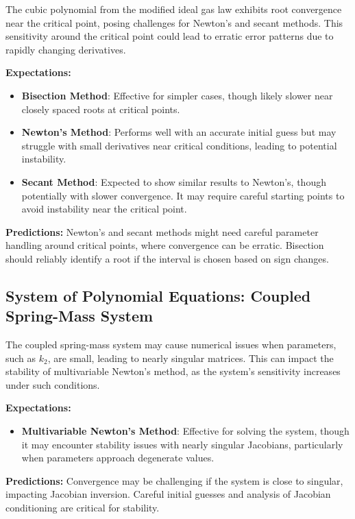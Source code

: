 \documentclass[12pt]{article}
\begin{document}
\noindent The cubic polynomial from the modified ideal gas law exhibits root convergence near the critical point, posing challenges for Newton's and secant methods. This sensitivity around the critical point could lead to erratic error patterns due to rapidly changing derivatives.

\noindent \textbf{Expectations:}
\begin{itemize}
    \item \textbf{Bisection Method}: Effective for simpler cases, though likely slower near closely spaced roots at critical points.
    \item \textbf{Newton’s Method}: Performs well with an accurate initial guess but may struggle with small derivatives near critical conditions, leading to potential instability.
    \item \textbf{Secant Method}: Expected to show similar results to Newton's, though potentially with slower convergence. It may require careful starting points to avoid instability near the critical point.
\end{itemize}

\noindent \textbf{Predictions:}  
Newton’s and secant methods might need careful parameter handling around critical points, where convergence can be erratic. Bisection should reliably identify a root if the interval is chosen based on sign changes.

\subsection*{System of Polynomial Equations: Coupled Spring-Mass System}

The coupled spring-mass system may cause numerical issues when parameters, such as \( k_2 \), are small, leading to nearly singular matrices. This can impact the stability of multivariable Newton’s method, as the system’s sensitivity increases under such conditions.

\noindent \textbf{Expectations:}
\begin{itemize}
    \item \textbf{Multivariable Newton’s Method}: Effective for solving the system, though it may encounter stability issues with nearly singular Jacobians, particularly when parameters approach degenerate values.
\end{itemize}

\noindent \textbf{Predictions:}  
Convergence may be challenging if the system is close to singular, impacting Jacobian inversion. Careful initial guesses and analysis of Jacobian conditioning are critical for stability.
\end{document}
